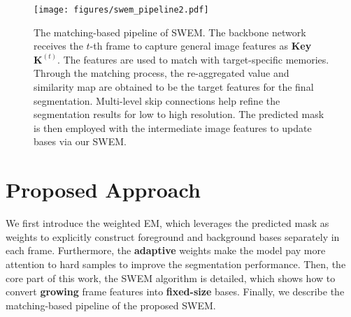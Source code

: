 \begin{figure*}
\begin{center}
\texttt{[image: figures/swem\_pipeline2.pdf]}
\end{center}
\vspace{-0.5cm}
   \caption{
The matching-based pipeline of SWEM. The backbone network receives the $t$-th frame to capture general image features as \textbf{Key} $\mathbf{K}^{(t)}$. The features are used to match with target-specific memories. Through the matching process, the re-aggregated value and similarity map are obtained to be the target features for the final segmentation. Multi-level skip connections help refine the segmentation results for low to high resolution. The predicted mask is then employed with the intermediate image features to update bases via our SWEM.}
\label{fig:SWEM}
\vspace{-0.5cm}
\end{figure*}

\section{Proposed Approach}
\label{sec:apporach}
We first introduce the weighted EM, which leverages the predicted mask as weights to explicitly construct foreground and background bases separately in each frame. 
Furthermore, the \textbf{adaptive} weights make the model pay more attention to hard samples to improve the segmentation performance. Then, the core part of this work, the SWEM algorithm is detailed, which shows how to convert \textbf{growing} frame features into \textbf{fixed-size} bases. Finally, we describe the matching-based pipeline of the proposed SWEM. 

